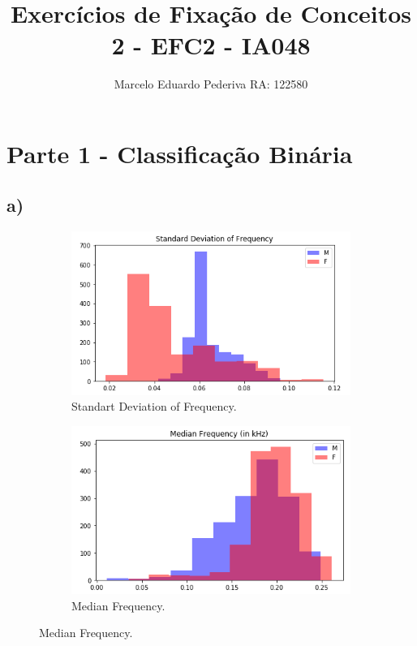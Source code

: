 \documentclass[12pt]{article}
\title{Exercícios de Fixação de Conceitos 2 - EFC2 - IA048}
\author{Marcelo Eduardo Pederiva RA: 122580}
\date{}
\begin{document}
\maketitle
\section*{Parte 1 - Classificação Binária}

\subsection*{a)}

\begin{figure}[h!]
		\centering
	\begin{subfigure}{0.49\linewidth}
		\centering
		\includegraphics[width=\linewidth]{images/hist_sdf_.png}
		\caption{Standart Deviation of Frequency.}
		\label{fig:hist_sdf}
	\end{subfigure}
	\begin{subfigure}{0.49\linewidth}
		\centering
		\includegraphics[width=\linewidth]{images/hist_median.png}
		\caption{Median Frequency.}
		\label{fig:hist_median}
	\end{subfigure}
	\hfill
	

\end{figure}
\end{document}
